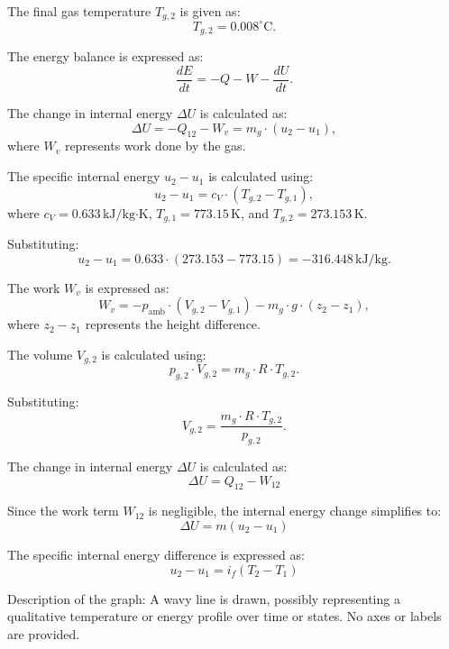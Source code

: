The final gas temperature \( T_{g,2} \) is given as:  
\[
T_{g,2} = 0.008^\circ \text{C}.
\]

The energy balance is expressed as:  
\[
\frac{dE}{dt} = -Q - W - \frac{dU}{dt}.
\]

The change in internal energy \( \Delta U \) is calculated as:  
\[
\Delta U = -Q_{12} - W_v = m_g \cdot (u_2 - u_1),
\]
where \( W_v \) represents work done by the gas.

The specific internal energy \( u_2 - u_1 \) is calculated using:  
\[
u_2 - u_1 = c_V \cdot (T_{g,2} - T_{g,1}),
\]
where \( c_V = 0.633 \, \text{kJ/kg·K} \), \( T_{g,1} = 773.15 \, \text{K} \), and \( T_{g,2} = 273.153 \, \text{K} \).

Substituting:  
\[
u_2 - u_1 = 0.633 \cdot (273.153 - 773.15) = -316.448 \, \text{kJ/kg}.
\]

The work \( W_v \) is expressed as:  
\[
W_v = -p_{\text{amb}} \cdot (V_{g,2} - V_{g,1}) - m_g \cdot g \cdot (z_2 - z_1),
\]
where \( z_2 - z_1 \) represents the height difference.

The volume \( V_{g,2} \) is calculated using:  
\[
p_{g,2} \cdot V_{g,2} = m_g \cdot R \cdot T_{g,2}.
\]

Substituting:  
\[
V_{g,2} = \frac{m_g \cdot R \cdot T_{g,2}}{p_{g,2}}.
\]

The change in internal energy \( \Delta U \) is calculated as:  
\[
\Delta U = Q_{12} - W_{12}
\]

Since the work term \( W_{12} \) is negligible, the internal energy change simplifies to:  
\[
\Delta U = m(u_2 - u_1)
\]

The specific internal energy difference is expressed as:  
\[
u_2 - u_1 = i_f(T_2 - T_1)
\]

Description of the graph:  
A wavy line is drawn, possibly representing a qualitative temperature or energy profile over time or states. No axes or labels are provided.